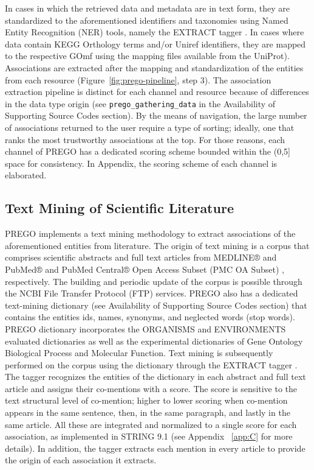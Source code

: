    In cases in which the retrieved data and metadata are in text form, they are standardized to the aforementioned identifiers and taxonomies using Named Entity Recognition (NER) tools, namely the EXTRACT tagger \parencite{pafilis2016extract, jensen2016one}. 
   In cases where data contain KEGG Orthology terms and/or Uniref identifiers, they are mapped to the respective GOmf using the mapping files available from the UniProt). 
   Associations are extracted after the mapping and standardization of the entities from each resource (Figure~\ref{fig:prego-pipeline}, step 3).
   The association extraction pipeline is distinct for each channel and resource because of differences in the data type origin (see \texttt{prego\_gathering\_data} in the Availability of Supporting Source Codes section). 
   By the means of navigation, the large number of associations returned to the user require a type of sorting; 
   ideally, one that ranks the most trustworthy associations at the top. 
   For those reasons, each channel of PREGO has a dedicated scoring scheme bounded within the (0,5] space for consistency. 
   In Appendix, the scoring scheme of each channel is elaborated.




   \subsection{Text Mining of Scientific Literature}
   \label{subsec:prego-tm}

   PREGO implements a text mining methodology to extract associations of the aforementioned entities from literature. 
   The origin of text mining is a corpus that comprises scientific abstracts and full text articles from MEDLINE® and PubMed® and PubMed Central® Open Access Subset (PMC OA Subset) \parencite{sayers2021database}, respectively. 
   The building and periodic update of the corpus is possible through the NCBI File Transfer Protocol (FTP) services. 
   PREGO also has a dedicated text-mining dictionary (see Availability of Supporting Source Codes section) that contains the entities ids, names, synonyms, and neglected words (stop words). 
   PREGO dictionary incorporates the ORGANISMS \parencite{pafilis2013species} and ENVIRONMENTS \parencite{pafilis2015environments} evaluated dictionaries as well as the experimental dictionaries of Gene Ontology Biological Process and Molecular Function.
   Text mining is subsequently performed on the corpus using the dictionary through the EXTRACT tagger \parencite{pafilis2016extract, jensen2016one}. 
   The tagger recognizes the entities of the dictionary in each abstract and full text article and assigns their co-mentions with a score. 
   The score is sensitive to the text structural level of co-mention; higher to lower scoring when co-mention appears in the same sentence, then, in the same paragraph, and lastly in the same article. 
   All these are integrated and normalized to a single score for each association, as implemented in STRING 9.1 \parencite{franceschini2012string} (see Appendix ~\ref{app:C} for more details). 
   In addition, the tagger extracts each mention in every article to provide the origin of each association it extracts.


